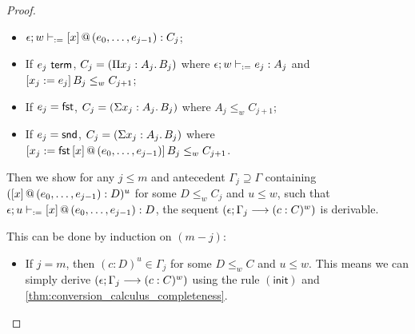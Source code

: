 \documentclass[twoside]{report}
\begin{document}
\begin{proof}
\begin{itemize}
    \begin{itemize}
        \item $\epsilon; w \vdash_{:=} {[x]}\,@\,({e_0, \ldots, e_{j-1}}) : C_j$;
        \item If $e_j \ \mathsf{term}$, $C_j = (\Pi{x_j} : {A_j}.\,{B_j})$ where $\epsilon; w \vdash_{:=} e_j : A_j$ and $[{x_j}:={e_j}]\,{B_j} \leq_w C_{j+1}$;
        \item If $e_j = \operatorname{\mathsf{fst}}$, $C_j = (\Sigma{x_j} : {A_j}.\,{B_j})$ where $A_j \leq_w C_{j+1}$;
        \item If $e_j = \operatorname{\mathsf{snd}}$, $C_j = (\Sigma{x_j} : {A_j}.\,{B_j})$ where $[{x_j}:={\operatorname{\mathsf{fst}} {[x]}\,@\,({e_0, \ldots, e_{j-1}})}]\,{B}_j \leq_w C_{j+1}$.
    \end{itemize}

    Then we show for any $j \leq m$ and antecedent $\Gamma_j \supseteq \Gamma$ containing $({[x]}\,@\,({e_0, \ldots, e_{j-1}}) : D)^u$ for some $D \leq_w C_j$ and $u \leq w$, such that $\epsilon; u \vdash_{:=} {[x]}\,@\,({e_0, \ldots, e_{j-1}}) : D$, the sequent $(\epsilon; \Gamma_j \longrightarrow (c : C)^w)$ is derivable.

    This can be done by induction on $(m - j)$:

    \begin{itemize}
        \item If $j = m$, then $(c : D)^u \in \Gamma_j$ for some $D \leq_w C$ and $u \leq w$. This means we can simply derive $(\epsilon; \Gamma_j \longrightarrow (c : C)^w)$ using the rule $(\mathsf{init})$ and \cref{thm:conversion_calculus_completeness}.


\end{itemize}
\end{itemize}
\end{proof}
\end{document}
